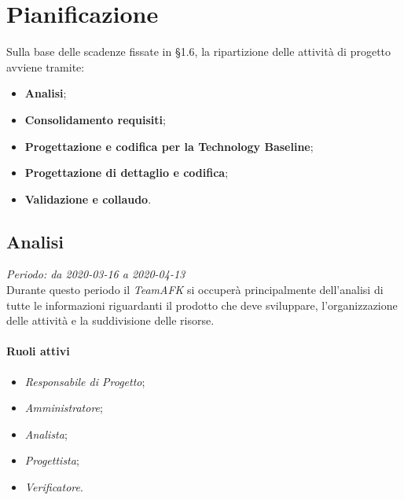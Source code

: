 \section{Pianificazione}
Sulla base delle scadenze fissate in §1.6, la ripartizione delle attività di progetto avviene tramite:
\begin{itemize}
\item \textbf{Analisi};
\item \textbf{Consolidamento requisiti};
\item \textbf{Progettazione e codifica per la Technology Baseline};
\item \textbf{Progettazione di dettaglio e codifica};
\item \textbf{Validazione e collaudo}.
\end{itemize}  

\subsection{Analisi}
\textit{Periodo: da 2020-03-16 a 2020-04-13} \\
Durante questo periodo il \textit{TeamAFK} si occuperà principalmente dell’analisi di tutte le informazioni riguardanti il prodotto che deve sviluppare, l’organizzazione delle attività e la suddivisione delle risorse.

\paragraph{Ruoli attivi} 
\begin{itemize}
\item \textit{Responsabile di Progetto};
\item \textit{Amministratore};
\item \textit{Analista};
\item \textit{Progettista};
\item \textit{Verificatore}.
\end{itemize}

